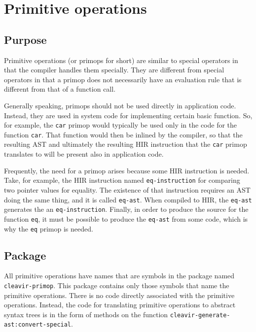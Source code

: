 \chapter{Primitive operations}

\section{Purpose}

Primitive operations (or primops for short) are similar to
\commonlisp{} special operators in that the compiler handles them
specially.  They are different from \commonlisp{} special operators in
that a primop does not necessarily have an evaluation rule that is
different from that of a function call.

Generally speaking, primops should not be used directly in application
code.  Instead, they are used in system code for implementing certain
basic \commonlisp{} function.  So, for example, the \texttt{car}
primop would typically be used only in the code for the \commonlisp{}
function \texttt{car}.  That function would then be inlined by the
compiler, so that the resulting AST and ultimately the resulting HIR
instruction that the \texttt{car} primop translates to will be present
also in application code.

Frequently, the need for a primop arises because some HIR instruction
is needed.  Take, for example, the HIR instruction named
\texttt{eq-instruction} for comparing two pointer values for equality.
The existence of that instruction requires an AST doing the same
thing, and it is called \texttt{eq-ast}.  When compiled to HIR, the
\texttt{eq-ast} generates the an \texttt{eq-instruction}.  Finally, in
order to produce the source for the \commonlisp{} function
\texttt{eq}, it must be possible to produce the \texttt{eq-ast} from
some \commonlisp{} code, which is why the \texttt{eq} primop is
needed.

\section{Package}

All primitive operations have names that are symbols in the package
named \texttt{cleavir-primop}.  This package contains only those
symbols that name the primitive operations.  There is no code directly
associated with the primitive operations.  Instead, the code for
translating primitive operations to abstract syntax trees
 is in the form of methods on the
function \texttt{cleavir-generate-ast:convert-special}.

